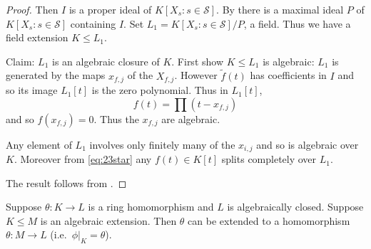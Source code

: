\documentclass{article}
\begin{document}
\begin{proof}
    Then $I$ is a proper ideal of $K[X_s : s \in \mathcal{S}]$. By  there is a maximal ideal $P$ of $K[X_s : s \in \mathcal{S}]$ containing $I$.
    Set $L_1 = K[X_s : s \in \mathcal{S}]/P$, a field.
    Thus we have a field extension $K \leq L_1$.

    Claim: $L_1$ is an algebraic closure of $K$.
    First show $K \leq L_1$ is algebraic: $L_1$ is generated by the maps $x_{f,j}$ of the $X_{f,j}$.
    However $\tilde{f}(t)$ has coefficients in $I$ and so its image $L_1[t]$ is the zero polynomial.
    Thus in $L_1[t]$,
    \begin{equation*}
        f(t) = \prod (t - x_{f,j}) \label{eq:23star}\tag{$*$}
    \end{equation*}
    and so $f(x_{f,j}) = 0$. Thus the $x_{f,j}$ are algebraic.

    Any element of $L_1$ involves only finitely many of the $x_{i,j}$ and so is algebraic over $K$.
    Moreover from \eqref{eq:23star} any $f(t) \in K[t]$ splits completely over $L_1$.

    The result follows from .
\end{proof}
\begin{nthm}\label{thm:5.8}
    Suppose $\theta: K \to L$ is a ring homomorphism and $L$ is algebraically closed.
    Suppose $K \leq M$ is an algebraic extension.
    Then $\theta$ can be extended to a homomorphism $\theta: M \to L$ (i.e.\ $\phi|_K = \theta$).
\end{nthm}
\end{document}
